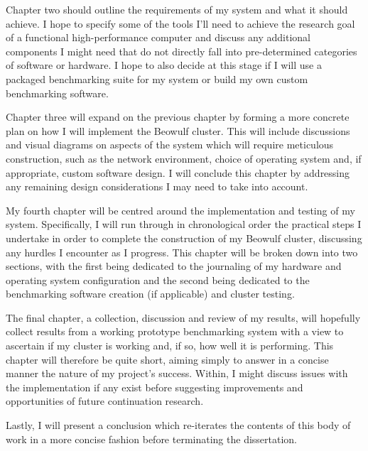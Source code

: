 Chapter two should outline the requirements of my system and what it should achieve. I hope to specify some of the tools I'll need to achieve the research goal of a functional high-performance computer and discuss any additional components I might need that do not directly fall into pre-determined categories of software or hardware. I hope to also decide at this stage if I will use a packaged benchmarking suite for my system or build my own custom benchmarking software.

Chapter three will expand on the previous chapter by forming a more concrete plan on how I will implement the Beowulf cluster. This will include discussions and visual diagrams on aspects of the system which will require meticulous construction, such as the network environment, choice of operating system and, if appropriate, custom software design. I will conclude this chapter by addressing any remaining design considerations I may need to take into account.

My fourth chapter will be centred around the implementation and testing of my system. Specifically, I will run through in chronological order the practical steps I undertake in order to complete the construction of my Beowulf cluster, discussing any hurdles I encounter as I progress. This chapter will be broken down into two sections, with the first being dedicated to the journaling of my hardware and operating system configuration and the second being dedicated to the benchmarking software creation (if applicable) and cluster testing.

The final chapter, a collection, discussion and review of my results, will hopefully collect results from a working prototype benchmarking system with a view to ascertain if my cluster is working and, if so, how well it is performing. This chapter will therefore be quite short, aiming simply to answer in a concise manner the nature of my project's success. Within, I might discuss issues with the implementation if any exist before suggesting improvements and opportunities of future continuation research.

Lastly, I will present a conclusion which re-iterates the contents of this body of work in a more concise fashion before terminating the dissertation.
